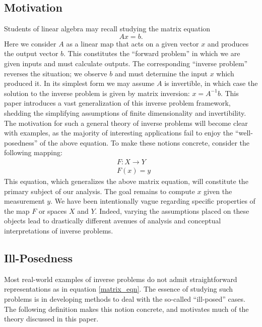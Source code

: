 \documentclass[12pt]{article}
\begin{document}
\subsection{Motivation}
Students of linear algebra may recall studying the matrix equation
\begin{equation} 
Ax = b. \label{matrix_eqn}
\end{equation}  
Here we consider $A$ as a linear map 
that acts on a given vector $x$ and produces the output vector $b$. 
This constitutes the ``forward problem'' in which we are given inputs and must 
calculate outputs. The corresponding ``inverse problem'' reverses the situation; we observe 
$b$ and must determine the input $x$ which produced it. In its simplest form we may assume 
$A$ is invertible, in which case the solution to the inverse problem is given by matrix 
inversion: $x = A^{-1}b$. This paper introduces a vast generalization of this inverse 
problem framework, shedding the simplifying assumptions of finite dimensionality
and invertibility. The motivation for such a general theory 
of inverse problems will become clear with examples, as the majority of interesting 
applications fail to enjoy the ``well-posedness'' of the above equation. 
To make these notions concrete, consider the following mapping:
\begin{eqnarray} 
&F: X \to Y \nonumber \\
&F(x) = y \label{inverse_problem}
\end{eqnarray} 
This equation, which generalizes the above matrix equation, will constitute the primary subject 
of our analysis. The goal remains to compute $x$ given the measurement $y$. We have been intentionally 
vague regarding specific properties of the map $F$ or spaces $X$ and $Y$. Indeed, varying the assumptions 
placed on these objects lead to drastically different avenues of analysis and conceptual interpretations
of inverse problems. 

\subsection{Ill-Posedness}

Most real-world examples of inverse problems do not admit straightforward representations as in equation \eqref{matrix_eqn}.
The essence of studying such problems is in developing methods to 
deal with the so-called ``ill-posed'' cases. The following definition makes this notion concrete, 
and motivates much of the theory discussed in this paper. 
\end{document}
